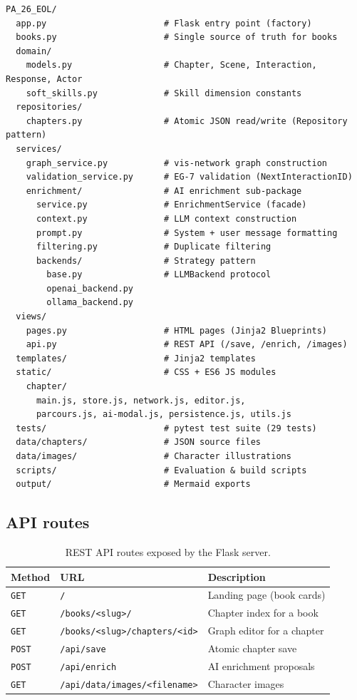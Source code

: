 \begin{lstlisting}[basicstyle=\ttfamily\scriptsize, frame=single, xleftmargin=2em]
PA_26_EOL/
  app.py                       # Flask entry point (factory)
  books.py                     # Single source of truth for books
  domain/
    models.py                  # Chapter, Scene, Interaction, Response, Actor
    soft_skills.py             # Skill dimension constants
  repositories/
    chapters.py                # Atomic JSON read/write (Repository pattern)
  services/
    graph_service.py           # vis-network graph construction
    validation_service.py      # EG-7 validation (NextInteractionID)
    enrichment/                # AI enrichment sub-package
      service.py               # EnrichmentService (facade)
      context.py               # LLM context construction
      prompt.py                # System + user message formatting
      filtering.py             # Duplicate filtering
      backends/                # Strategy pattern
        base.py                # LLMBackend protocol
        openai_backend.py
        ollama_backend.py
  views/
    pages.py                   # HTML pages (Jinja2 Blueprints)
    api.py                     # REST API (/save, /enrich, /images)
  templates/                   # Jinja2 templates
  static/                      # CSS + ES6 JS modules
    chapter/
      main.js, store.js, network.js, editor.js,
      parcours.js, ai-modal.js, persistence.js, utils.js
  tests/                       # pytest test suite (29 tests)
  data/chapters/               # JSON source files
  data/images/                 # Character illustrations
  scripts/                     # Evaluation & build scripts
  output/                      # Mermaid exports
\end{lstlisting}

\subsection*{API routes}

\begin{table}[!htbp]
\centering
\small
\begin{tabular}{l l l}
\toprule
\textbf{Method} & \textbf{URL} & \textbf{Description} \\
\midrule
\texttt{GET} & \texttt{/} & Landing page (book cards) \\
\texttt{GET} & \texttt{/books/<slug>/} & Chapter index for a book \\
\texttt{GET} & \texttt{/books/<slug>/chapters/<id>} & Graph editor for a chapter \\
\texttt{POST} & \texttt{/api/save} & Atomic chapter save \\
\texttt{POST} & \texttt{/api/enrich} & AI enrichment proposals \\
\texttt{GET} & \texttt{/api/data/images/<filename>} & Character images \\
\bottomrule
\end{tabular}
\caption{REST API routes exposed by the Flask server.}
\end{table}



